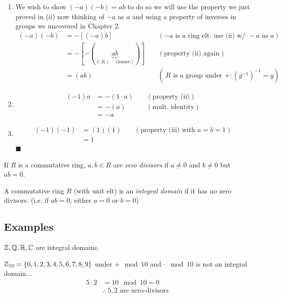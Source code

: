 \begin{lemma}
\begin{enumerate}[label=(\roman*)]
    $\therefore \ \  a(-b)=-(ab)$. \\ For the other one (i.e. in order to show $(-a)b=-(ab)$  ) we
    need the other distributive law.
    \item We wish to show $(-a)(-b)=ab$ to do so we will use the property we just proved in (ii) now
    thinking of $-a$ as $a$ and using a property of inverses in groups we uncovered in Chapter 2.
    \begin{align}
        (-a)(-b)&= -[(-a)b] \ \ \ \ \ & (-a \text{ is a ring elt. use (ii) w/ }-a \text{ as }a ) \nonumber \\
        &= -[-(\underbrace{ab}_{\in R \ (\ \cdot \text{ closure})})] \ \ \ \ \ & ( \text{property (ii) again}) \nonumber \\
        &= (ab) \ \ \ \ \ & (\ R\text{ is a group under }+: (g^{-1})^{-1}=g) \nonumber
    \end{align}
    \item \begin{align}
        (-1)a&= -(1\cdot a) \ \ \ \ \ & ( \text{property (ii)}) \nonumber \\
        &= -(a) \ \ \ \ \ & (\text{mult. identity}) \nonumber \\
        &= -a \nonumber
    \end{align}
    \item \begin{align}
        (-1)(-1)&= (1)(1)  \ \ \ \ \ & (\text{property (iii) with }a=b=1) \nonumber \\
        &= 1 \nonumber
    \end{align}
    $\blacksquare$
\end{enumerate}
\end{lemma}

\begin{definition}
If $R$ is a commutative ring, $a,b\in R$ are \textit{zero divisors} if $a\neq 0$ and $b\neq 0$ but
$ab=0$.
\end{definition}
\begin{definition}
A commutative ring $R$ (with unit elt) is an \textit{integral domain} if it has no zero divisors.
(i.e. if $ab=0$, either $a=0$ or $b=0$)
\end{definition}
\subsection*{Examples}
\begin{example}
${\mathbb{Z}},{\mathbb{Q}},{\mathbb{R}},{\mathbb{C}}$ are integral domains.
\end{example}
\begin{example}
${\mathbb{Z}}_{10}=\{0,1,2,3,4,5,6,7,8,9\}$ under $+\mod 10$ and $\cdot \mod 10$ is not an integral domain...
\begin{align}
    5\cdot 2 &= 10\mod 10 = 0 \nonumber \\
    &\therefore \ 5,2 \text{ are zero-divisors} \nonumber
\end{align}
\end{example}


